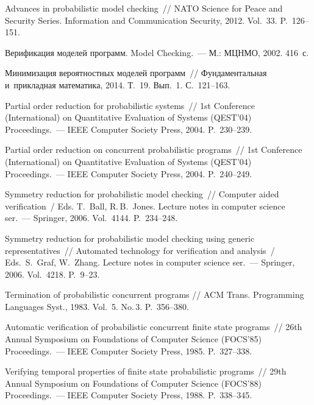 \begin{multicols}{2}
{{\begin{thebibliography}{99}
 Advances in probabilistic model
checking~// NATO Science for Peace and Security Series. Information
and Communication Security, 2012. Vol.~33. P.~126--151.

 Верификация моделей
программ. Model Checking.~--- М.: МЦНМО, 2002. 416~с.

 Минимизация вероятностных
моделей программ~// Фундаментальная и~прикладная математика, 2014.
Т.~19. Вып.~1. С.~121--163.

 Partial order reduction
for probabilistic systems~// 1st Conference (International)
on Quantitative Evaluation of Systems (QEST'04) Proceedings.~--- IEEE
Computer Society Press, 2004. P.~230--239.

 Partial order reduction on
concurrent probabilistic programs~//  1st
Conference (International) on Quantitative Evaluation of Systems
(QEST'04) Proceedings.~--- IEEE Computer Society Press, 2004. P.~240--249.

 Symmetry reduction for
probabilistic model checking~// Computer aided verification~/
Eds. T.~Ball, R.\,B.~Jones.
Lecture notes in computer science ser.~--- Springer, 2006.  Vol.~4144. P.~234--248.

 Symmetry reduction for probabilistic
model checking using generic representatives~//
Automated technology for verification
and analysis~/ Eds.\ S.~Graf, W.~Zhang. Lecture notes in computer science ser.~--- Springer, 2006.
Vol.~4218. P.~9--23.



 Termination of probabilistic
concurrent programs // ACM Trans. Programming Languages
Syst., 1983. Vol.~5. No.\,3. P.~356--380.

 Automatic verification of probabilistic concurrent
finite state programs~// 26th Annual Symposium on
Foundations of Computer Science (FOCS'85) Proceedings.~--- IEEE Computer Society
Press, 1985. P.~327--338.

 Verifying temporal properties
of finite state probabilistic programs~// 29th
Annual Symposium on Foundations of Computer Science (FOCS'88) Proceedings.~---
IEEE Computer Society Press, 1988. P.~338--345.



\end{thebibliography}}}
\end{multicols}
